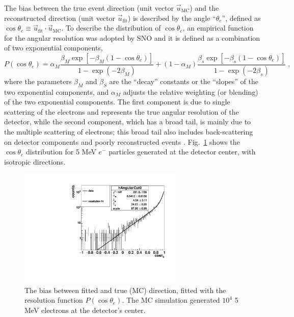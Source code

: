The bias between the true event direction (unit vector $\vec{u}_{\mathrm{MC}}$) and the reconstructed direction (unit vector $\vec{u}_{\mathrm{fit}}$) is described by the angle ``$\theta_e$'', defined as $\cos\theta_e \equiv \vec{u}_{\mathrm{fit}} \cdot \vec{u}_{\mathrm{MC}}$. To describe the distribution of $\cos\theta_e$, an empirical function for the angular resolution was adopted by SNO \cite{boulay2004direct} and it is defined as a combination of two exponential components,
\begin{equation}\label{eq:directResol}
P(\cos\theta_e)=\alpha_M\frac{\beta_M\exp[-\beta_M(1-\cos\theta_e)]}{1-\exp(-2\beta_M)}+(1-\alpha_M)\frac{\beta_s\exp[-\beta_s(1-\cos\theta_e)]}{1-\exp(-2\beta_s)}\;,
\end{equation}
where the parameters $\beta_M$ and $\beta_S$ are the ``decay'' constants or the ``slopes'' of the two exponential components, and $\alpha_M$ adjusts the relative weighting (or blending) of the two exponential components. The first component is due to single scattering of the electrons and represents the true angular resolution of the detector, while the second component, which has a broad tail, is mainly due to the multiple scattering of electrons; this broad tail also includes back-scattering on detector components and poorly reconstructed events \cite{boulay2004direct}. Fig.~\ref{fig:directionResol_5MeV} shows the $\cos\theta_e$ distribution for 5 MeV $e^-$ particles generated at the detector center, with isotropic directions.

\begin{figure}[htbp]
	\centering
	\includegraphics[width=8cm]{MPW_waterDirection_5MeV.pdf}
	\caption[The bias between the fitted and true (MC) direction.]{The bias between fitted and true (MC) direction, fitted with the resolution function $P(\cos\theta_e)$. The MC simulation generated $10^4$ 5 MeV electrons at the detector's center.\label{fig:directionResol_5MeV}}%
\end{figure}

